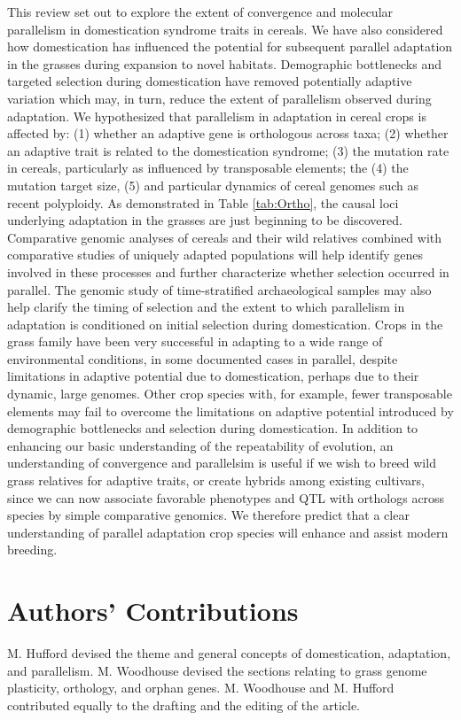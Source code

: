 \documentclass[12pt]{article}
\begin{document}
This review set out to explore the extent of convergence and molecular parallelism in domestication syndrome traits in cereals.
We have also considered how domestication has influenced the potential for subsequent parallel adaptation in the grasses during expansion to novel habitats. 
Demographic bottlenecks and targeted selection during domestication have removed potentially adaptive variation which may, in turn, reduce the extent of parallelism observed during adaptation.
We hypothesized that parallelism in adaptation in cereal crops is affected by:  (1) whether an adaptive gene is orthologous across taxa; (2) whether an adaptive trait is related to the domestication syndrome; (3) the mutation rate in cereals, particularly as influenced by transposable elements; the (4) the mutation target size, (5) and particular dynamics of cereal genomes such as recent polyploidy.
As demonstrated in Table \ref{tab:Ortho}, the causal loci underlying adaptation in the grasses are just beginning to be discovered.
Comparative genomic analyses of cereals and their wild relatives combined with comparative studies of uniquely adapted populations will help identify genes involved in these processes and further characterize whether selection occurred in parallel.
The genomic study of time-stratified archaeological samples may also help clarify the timing of selection and the extent to which parallelism in adaptation is conditioned on initial selection during domestication.
Crops in the grass family have been very successful in adapting to a wide range of environmental conditions, in some documented cases in parallel, despite limitations in adaptive potential due to domestication, perhaps due to their dynamic, large genomes.
Other crop species with, for example, fewer transposable elements may fail to overcome the limitations on adaptive potential introduced by demographic bottlenecks and selection during domestication.
In addition to enhancing our basic understanding of the repeatability of evolution, an understanding of convergence and parallelsim is useful if we wish to breed wild grass relatives for adaptive traits, or create hybrids among existing cultivars, since we can now associate favorable phenotypes and QTL with orthologs across species by simple comparative genomics.
We therefore predict that a clear understanding of parallel adaptation crop species will enhance and assist modern breeding.

\section*{Authors' Contributions}
M. Hufford devised the theme and general concepts of domestication, adaptation, and parallelism. M. Woodhouse devised the sections relating to grass genome plasticity, orthology, and orphan genes. M. Woodhouse and M. Hufford contributed equally to the drafting and the editing of the article.
\end{document}
